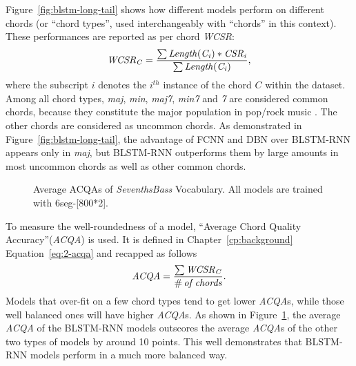 Figure~\ref{fig:blstm-long-tail} shows how different models perform on different chords (or ``chord types'', used interchangeably with ``chords'' in this context). These performances are reported as per chord \textit{WCSR}:
\begin{equation}
	\mathit{WCSR_{C} = {\sum{Length(C_i)*CSR_i} \over \sum{Length(C_i)}}},
	\label{eq:wcsrchord}
\end{equation}
where the subscript $i$ denotes the $i^{th}$ instance of the chord $C$ within the dataset. Among all chord types, \textit{maj}, \textit{min}, \textit{maj7}, \textit{min7} and \textit{7} are considered common chords, because they constitute the major population in pop/rock music \cite{burgoyne2011expert}. The other chords are considered as uncommon chords. As demonstrated in Figure~\ref{fig:blstm-long-tail}, the advantage of FCNN and DBN over BLSTM-RNN appears only in \textit{maj}, but BLSTM-RNN outperforms them by large amounts in most uncommon chords as well as other common chords.

\begin{figure}[htb]
	\centering
	\caption{Average ACQAs of \textit{SeventhsBass} Vocabulary. All models are trained with 6seg-[800*2].}
	\label{fig:acqa}
\end{figure}

To measure the well-roundedness of a model, ``Average Chord Quality Accuracy''(\textit{ACQA}) \cite{cho2014improved} is used. It is defined in Chapter~\ref{cp:background} Equation~\ref{eq:2-acqa} and recapped as follows
\begin{equation}
	\mathit{ACQA = {{\sum{WCSR_{C}}} \over {\#\,of\,chords}}}.
	\label{eq:3-acqa}
\end{equation}
Models that over-fit on a few chord types tend to get lower \textit{ACQA}s, while those well balanced ones will have higher \textit{ACQA}s. As shown in Figure~\ref{fig:acqa}, the average \textit{ACQA} of the BLSTM-RNN models outscores the average \textit{ACQA}s of the other two types of models by around 10 points. This well demonstrates that BLSTM-RNN models perform in a much more balanced way.

